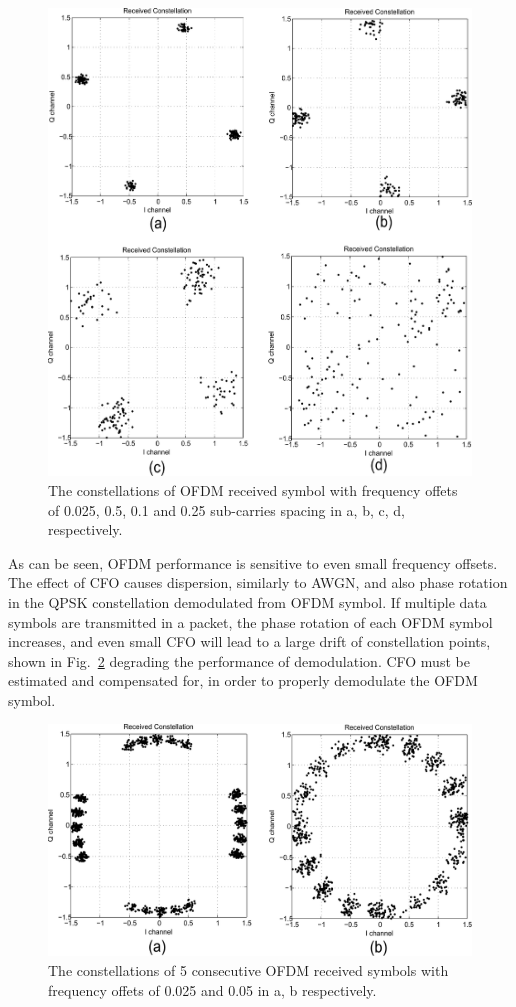 \begin{figure}
	\centerline{\includegraphics [width=0.8\columnwidth] {Figures/freoff_1sym.pdf} }
	\caption{The constellations of OFDM received symbol with frequency offets of 0.025, 0.5, 0.1 and 0.25 sub-carries spacing in a, b, c, d, respectively.}
	\label{fig:freoff_1sym}
\end{figure}

As can be seen, OFDM performance is sensitive to even small frequency offsets. 
The effect of CFO causes dispersion, similarly to AWGN, and also phase rotation in the QPSK constellation demodulated from OFDM symbol.
If multiple data symbols are transmitted in a packet, the phase rotation of each OFDM symbol increases, and even small CFO will lead to a large drift of constellation points, shown in Fig.~\ref{fig:freoff_5sym} degrading the performance of demodulation. CFO must be estimated and compensated for, in order to properly demodulate the OFDM symbol.

\begin{figure}
	\centerline{\includegraphics [width=0.8\columnwidth] {Figures/freoff_5sym.pdf} }
	\caption{The constellations of 5 consecutive OFDM received symbols with frequency offets of 0.025 and 0.05 in a, b respectively.}
	\label{fig:freoff_5sym}
\end{figure}

